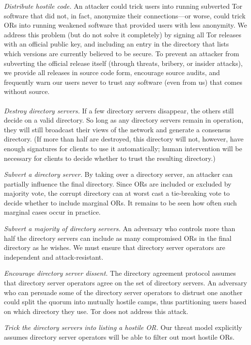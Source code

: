 \documentclass[times,10pt,twocolumn]{article}
\begin{document}
\emph{Distribute hostile code.} An attacker could trick users
into running subverted Tor software that did not, in fact, anonymize
their connections---or worse, could trick ORs into running weakened
software that provided users with less anonymity.  We address this
problem (but do not solve it completely) by signing all Tor releases
with an official public key, and including an entry in the directory
that lists which versions are currently believed to be secure.  To
prevent an attacker from subverting the official release itself
(through threats, bribery, or insider attacks), we provide all
releases in source code form, encourage source audits, and
frequently warn our users never to trust any software (even from
us) that comes without source.\\

\\
\emph{Destroy directory servers.}  If a few directory
servers disappear, the others still decide on a valid
directory.  So long as any directory servers remain in operation,
they will still broadcast their views of the network and generate a
consensus directory.  (If more than half are destroyed, this
directory will not, however, have enough signatures for clients to
use it automatically; human intervention will be necessary for
clients to decide whether to trust the resulting directory.)

\emph{Subvert a directory server.}  By taking over a directory server,
an attacker can partially influence the final directory.  Since ORs
are included or excluded by majority vote, the corrupt directory can
at worst cast a tie-breaking vote to decide whether to include
marginal ORs.  It remains to be seen how often such marginal cases
occur in practice.

\emph{Subvert a majority of directory servers.} An adversary who controls
more than half the directory servers can include as many compromised
ORs in the final directory as he wishes. We must ensure that directory
server operators are independent and attack-resistant.

\emph{Encourage directory server dissent.}  The directory
agreement protocol assumes that directory server operators agree on
the set of directory servers.  An adversary who can persuade some
of the directory server operators to distrust one another could
split the quorum into mutually hostile camps, thus partitioning
users based on which directory they use.  Tor does not address
this attack.

\emph{Trick the directory servers into listing a hostile OR.}
Our threat model explicitly assumes directory server operators will
be able to filter out most hostile ORs.
\end{document}
